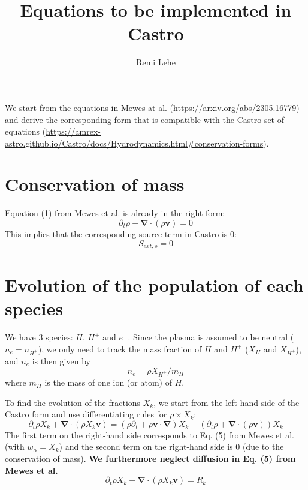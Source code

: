 \documentclass[11pt, oneside]{article}   	%
\title{Equations to be implemented in Castro}
\author{Remi Lehe}
\begin{document}
\maketitle

We start from the equations in Mewes at al. (\url{https://arxiv.org/abs/2305.16779}) and derive the corresponding form that is compatible with the Castro set of equations (\url{https://amrex-astro.github.io/Castro/docs/Hydrodynamics.html#conservation-forms}).

\section{Conservation of mass}

Equation (1) from Mewes et al. is already in the right form:
\[ \partial_t \rho + \boldsymbol{\nabla}\cdot( \rho\boldsymbol{v} ) = 0  \]
This implies that the corresponding source term in Castro is 0:
\[ S_{ext,\rho} = 0 \] 

\section{Evolution of the population of each species}

We have 3 species: $H$, $H^+$ and $e^{-}$. Since the plasma is assumed to be neutral ($n_e = n_{H^+}$), we only need to track the mass fraction of $H$ and $H^+$ ($X_H$ and $X_{H^+}$), and $n_e$ is then given by
\[ n_e = \rho X_{H^+} / m_H \]
where $m_H$ is the mass of one ion (or atom) of $H$.

To find the evolution of the fractions $X_k$, we start from the left-hand side of the Castro form and use differentiating rules for $\rho \times X_k$:
\[ \partial_t \rho X_k + \boldsymbol{\nabla}\cdot( \rho X_k \boldsymbol{v} ) =  (\rho\partial_t + \rho \boldsymbol{v}\cdot\boldsymbol{\nabla})X_k + (\partial_t \rho + \boldsymbol{\nabla}\cdot(\rho \boldsymbol{v} ) ) X_k\]
The first term on the right-hand side corresponds to Eq. (5) from Mewes et al. (with $w_\alpha = X_k$) and the second term on the right-hand side is 0 (due to the conservation of mass). \textbf{We furthermore neglect diffusion in Eq. (5) from Mewes et al.}
\[ \partial_t \rho X_k + \boldsymbol{\nabla}\cdot( \rho X_k \boldsymbol{v} ) = R_k \]
\end{document}
